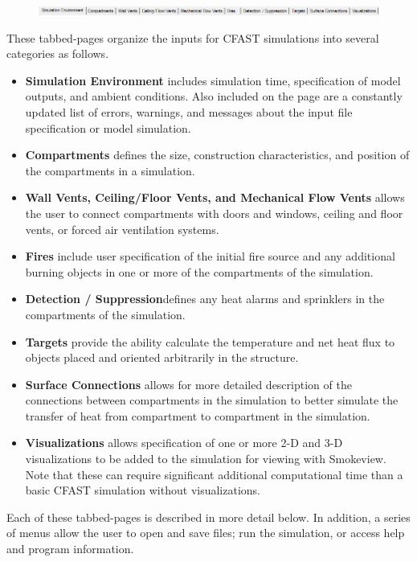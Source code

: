 \begin{figure}[h!]
\begin{center}
\includegraphics[width=6.5in]{FIGURES/Input_File/Tabs}
\end{center}
\end{figure}

These tabbed-pages organize the inputs for CFAST simulations into several categories as follows.
\begin{itemize}
\item \textbf{Simulation Environment} includes simulation time, specification of model outputs, and ambient conditions. Also included on the page are a constantly updated list of errors, warnings, and messages about the input file specification or model simulation.
\item \textbf{Compartments} defines the size, construction characteristics, and position of the compartments in a simulation.
\item \textbf{Wall Vents, Ceiling/Floor Vents, and Mechanical Flow Vents} allows the user to connect compartments with doors and windows, ceiling and floor vents, or forced air ventilation systems.
\item \textbf{Fires} include user specification of the initial fire source and any additional burning objects in one or more of the compartments of the simulation.
\item \textbf{Detection / Suppression}defines any heat alarms and sprinklers in the compartments of the simulation.
\item \textbf{Targets} provide the ability calculate the temperature and net heat flux to objects placed and oriented arbitrarily in the structure.
\item \textbf{Surface Connections} allows for more detailed description of the connections between compartments in the simulation to better simulate the transfer of heat from compartment to compartment in the simulation.
\item \textbf{Visualizations} allows specification of one or more 2-D and 3-D visualizations to be added to the simulation for viewing with Smokeview. Note that these can require significant additional computational time than a basic CFAST simulation without visualizations.
\end{itemize}

Each of these tabbed-pages is described in more detail below. In addition, a series of menus allow the user to open and save files; run the simulation, or access help and program information.


